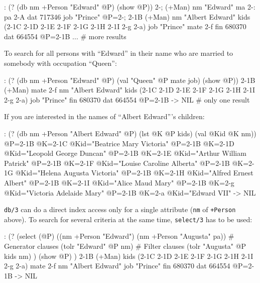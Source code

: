 \begin{wideverbatim}
: (? (db nm +Person "Edward" @P) (show @P))
{2-;} (+Man)
   nm "Edward"
   ma {2-:}
   pa {2-A}
   dat 717346
   job "Prince"
 @P={2-;}
{2-1B} (+Man)
   nm "Albert Edward"
   kids ({2-1C} {2-1D} {2-1E} {2-1F} {2-1G} {2-1H} {2-1I} {2-g} {2-a})
   job "Prince"
   mate {2-f}
   fin 680370
   dat 664554
 @P={2-1B}
...               # more results
\end{wideverbatim}

To search for all persons with ``Edward'' in their name who are married to
somebody with occupation ``Queen'':


\begin{wideverbatim}
: (? (db nm +Person "Edward" @P) (val "Queen" @P mate job) (show @P))
{2-1B} (+Man)
   mate {2-f}
   nm "Albert Edward"
   kids ({2-1C} {2-1D} {2-1E} {2-1F} {2-1G} {2-1H} {2-1I} {2-g} {2-a})
   job "Prince"
   fin 680370
   dat 664554
 @P={2-1B}
-> NIL            # only one result
\end{wideverbatim}

If you are interested in the names of ``Albert Edward'''s children:


\begin{wideverbatim}
: (? (db nm +Person "Albert Edward" @P) (lst @K @P kids) (val @Kid @K nm))
 @P={2-1B} @K={2-1C} @Kid="Beatrice Mary Victoria"
 @P={2-1B} @K={2-1D} @Kid="Leopold George Duncan"
 @P={2-1B} @K={2-1E} @Kid="Arthur William Patrick"
 @P={2-1B} @K={2-1F} @Kid="Louise Caroline Alberta"
 @P={2-1B} @K={2-1G} @Kid="Helena Augusta Victoria"
 @P={2-1B} @K={2-1H} @Kid="Alfred Ernest Albert"
 @P={2-1B} @K={2-1I} @Kid="Alice Maud Mary"
 @P={2-1B} @K={2-g} @Kid="Victoria Adelaide Mary"
 @P={2-1B} @K={2-a} @Kid="Edward VII"
-> NIL
\end{wideverbatim}

\texttt{db/3} can do a direct index access only for a single attribute (\texttt{nm} of
\texttt{+Person} above). To search for several criteria at the same time,
\texttt{select/3} has to be used:


\begin{wideverbatim}
: (?
   (select (@P)
      ((nm +Person "Edward") (nm +Person "Augusta" pa))  # Generator clauses
      (tolr "Edward" @P nm)                              # Filter clauses
      (tolr "Augusta" @P kids nm) )
   (show @P) )
{2-1B} (+Man)
   kids ({2-1C} {2-1D} {2-1E} {2-1F} {2-1G} {2-1H} {2-1I} {2-g} {2-a})
   mate {2-f}
   nm "Albert Edward"
   job "Prince"
   fin 680370
   dat 664554
 @P={2-1B}
-> NIL
\end{wideverbatim}


